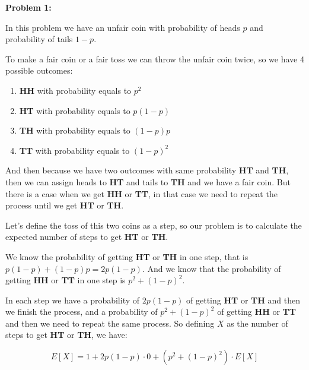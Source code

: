 \textbf{Problem 1:}

\singlespacing

In this problem we have an unfair coin with probability of heads $p$
and probability of tails $1-p$.

\singlespacing

To make a fair coin or a fair toss we can throw the unfair coin twice,
so we have 4 possible outcomes:

\singlespacing

\begin{enumerate}
    \item \textbf{HH} with probability equals to $p^2$
    \item \textbf{HT} with probability equals to $p(1-p)$
    \item \textbf{TH} with probability equals to $(1-p)p$
    \item \textbf{TT} with probability equals to $(1-p)^2$
\end{enumerate}

\singlespacing

And then because we have two outcomes with same probability \textbf{HT}
and \textbf{TH}, then we can assign heads to \textbf{HT} and tails to
\textbf{TH} and we have a fair coin. But there is a case when we get
\textbf{HH} or \textbf{TT}, in that case we need to repeat the process
until we get \textbf{HT} or \textbf{TH}.

\singlespacing

Let's define the toss of this two coins as a step, so our problem is to calculate
the expected number of steps to get \textbf{HT} or \textbf{TH}.

\singlespacing

We know the probability of getting \textbf{HT} or \textbf{TH} in one step, that
is $p(1-p) + (1-p)p = 2p(1-p)$. And we know that the probability of getting
\textbf{HH} or \textbf{TT} in one step is $p^2 + (1-p)^2$.

\singlespacing

In each step we have a probability of $2p(1-p)$ of getting \textbf{HT} or
\textbf{TH} and then we finish the process, and a probability of $p^2 + (1-p)^2$
of getting \textbf{HH} or \textbf{TT} and then we need to repeat the same process.
So defining $X$ as the number of steps to get \textbf{HT} or \textbf{TH}, we have:

\singlespacing

\begin{equation}
    E[X] = 1 + 2p(1-p) \cdot 0 + (p^2 + (1-p)^2)\cdot E[X]
\end{equation}

